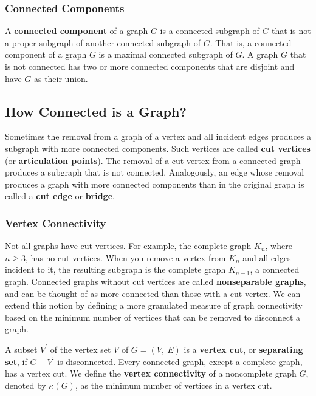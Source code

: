 \documentclass[11pt]{article}
\begin{document}
\subsubsection{Connected Components}

A \textbf{connected component} of a graph $G$ is a connected subgraph of $G$ that is not a proper subgraph of another connected subgraph of $G$. That is, a connected component of a graph $G$ is a maximal connected subgraph of $G$. A graph $G$ that is not connected has two or more connected components that are disjoint and have $G$ as their union.

\newpage
\subsection{How Connected is a Graph?}

Sometimes the removal from a graph of a vertex and all incident edges produces a subgraph with more connected components. Such vertices are called \textbf{cut vertices} (or \textbf{articulation points}). The removal of a cut vertex from a connected graph produces a subgraph that is not connected. Analogously, an edge whose removal produces a graph with more connected components than in the original graph is called a \textbf{cut edge} or \textbf{bridge}.

\subsubsection{Vertex Connectivity}

Not all graphs have cut vertices. For example, the complete graph $K_n$, where $n \geq 3$, has no cut vertices. When you remove a vertex from $K_n$ and all edges incident to it, the resulting subgraph is the complete graph $K_{n-1}$, a connected graph. Connected graphs without cut vertices are called \textbf{nonseparable graphs}, and can be thought of as more connected than those with a cut vertex. We can extend this notion by defining a more granulated measure of graph connectivity based on the minimum number of vertices that can be removed to disconnect a graph.

A subset $V^{'}$ of the vertex set $V$ of $G = (V,\ E)$ is a \textbf{vertex cut}, or \textbf{separating set}, if $G - V^{'}$ is disconnected. Every connected graph, except a complete graph, has a vertex cut. We define the \textbf{vertex connectivity} of a noncomplete graph $G$, denoted by $\kappa(G)$, as the minimum number of vertices in a vertex cut.
\end{document}
